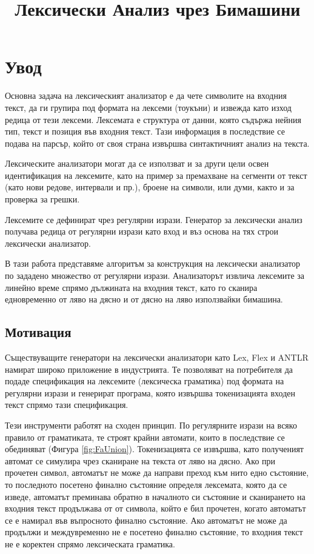 \documentclass[12pt, oneside]{article}
\title{Лексически Анализ чрез Бимашини}
\theoremstyle{definition}
\begin{document}
\tableofcontents

\pagebreak
\section{Увод}

Основна задача на лексическият анализатор е да чете символите на входния текст, да ги групира под формата на лексеми (тоукъни) и извежда като изход редица от тези лексеми. Лексемата е структура от данни, която съдържа нейния тип, текст и позиция във входния текст. Тази информация в последствие се подава на парсър, който от своя страна извършва синтактичният анализ на текста.

Лексическите анализатори могат да се използват и за други цели освен идентификация на лексемите, като на пример за премахване на сегменти от текст (като нови редове, интервали и пр.), броене на символи, или думи, както и за проверка за грешки.

Лексемите се дефинират чрез регулярни изрази. Генератор за лексически анализ получава редица от регулярни изрази като вход и въз основа на тях строи лексически анализатор.

В тази работа представяме алгоритъм за конструкция на лексически анализатор по зададено множество от регулярни изрази. Анализаторът извлича лексемите за линейно време спрямо дължината на входния текст, като го сканира едновременно от ляво на дясно и от дясно на ляво използвайки бимашина.


\subsection{Мотивация}

Съществуващите генератори на лексически анализатори като Lex, Flex и ANTLR намират широко приложение в индустрията. Те позволяват на потребителя да подаде спецификация на лексемите (лексическа граматика) под формата на регулярни изрази и генерират програма, която извършва токенизацията входен текст спрямо тази спецификация.

Тези инструменти работят на сходен принцип. По регулярните изрази на всяко правило от граматиката, те строят крайни автомати, които в последствие се обединяват (Фигура \ref{fig:FaUnion}). Токенизацията се извършва, като полученият автомат се симулира чрез сканиране на текста от ляво на дясно. 
Ако при прочетен символ, автоматът не може да направи преход към нито едно състояние, то последното посетено финално състояние определя лексемата, която да се изведе, автоматът преминава обратно в началното си състояние и сканирането на входния текст продължава от от символа, който е бил прочетен, когато автоматът се е намирал във въпросното финално състояние. Ако автоматът не може да продължи и междувременно не е посетено финално състояние, то входния текст не е коректен спрямо лексическата граматика.
\end{document}
